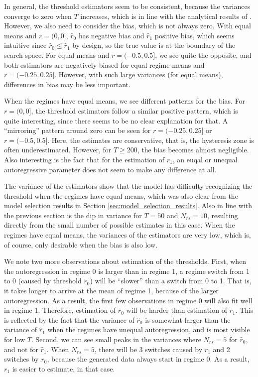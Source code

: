 \documentclass{article}
\begin{document}
In general, the threshold estimators seem to be consistent, because the variances converge to zero when $T$ increases, which is in line with the analytical results of \cite{bar2}.
However, we also need to consider the bias, which is not always zero. 
With equal means and $r = (0, 0]$, $\hat{r}_0$ has negative bias and $\hat{r}_1$ positive bias, which seems intuitive since $\hat{r}_0 \le \hat{r}_1$ by design, so the true value is at the boundary of the search space.
For equal means and $r = (-0.5, 0.5]$, we see quite the opposite, and both estimators are negatively biased for equal regime means and $r = (-0.25, 0.25]$. However, with such large variances (for equal means), differences in bias may be less important.

When the regimes have equal means, we see different patterns for the bias. For $r = (0, 0]$, the threshold estimators follow a similar positive pattern, which is quite  interesting, since there seems to be no clear explanation for that.
A ``mirroring'' pattern around zero can be seen for $r = (-0.25, 0.25]$ or $r = (-0.5, 0.5]$. Here, the estimates are conservative, that is, the hysteresis zone is often underestimated.
However, for $T\ge 200$, the bias becomes almost negligible.
Also interesting is the fact that for the estimation of $r_1$, an euqal or unequal autoregressive parameter does not seem to make any difference at all.

The variance of the estimators show that the model has difficulty recognizing the threshold when the regimes have equal means, which was also clear from the model selection results in Section \ref{sec:model_selection_results}. 
Also in line with the previous section is the dip in variance for $T = 50$ and $N_{rs}= 10$, resulting directly from the small number of possible estimates in this case.
When the regimes have equal means, the variances of the estimators are very low, which is, of course, only desirable when the bias is also low.

We note two more observations about estimation of the thresholds. 
First, when the autoregression in regime 0 is larger than in regime 1, a regime switch from 1 to 0 (caused by threshold $r_0$) will be ``slower'' than a switch from 0 to 1. That is, it takes longer to arrive at the mean of regime 1, because of the larger autoregression. 
As a result, the first few observations in regime 0 will also fit well in regime 1. Therefore, estimation of $r_0$ will be harder than estimation of $r_1$. 
This is reflected by the fact that the variance of $\hat{r}_0$ is somewhat larger than the variance of $\hat{r}_1$ when the regimes have unequal autoregression, and is most visible for low $T$.
Second, we can see small peaks in the variances where $N_{rs} = 5$ for $\hat{r}_0$, and not for $\hat{r}_1$. 
When $N_{rs} = 5$, there will be 3 switches caused by $r_1$ and 2 switches by $r_0$, because the generated data always start in regime 0. As a result, $r_1$ is easier to estimate, in that case.
\end{document}
